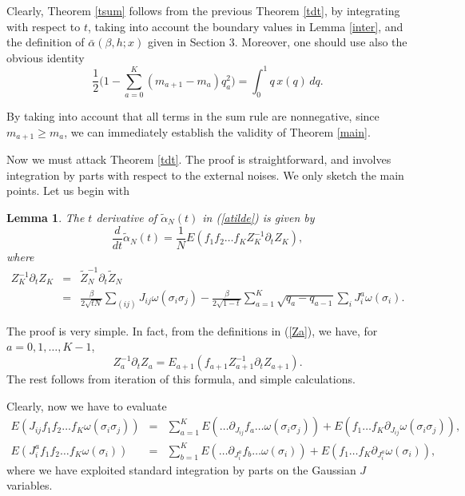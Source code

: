 \documentclass[a4paper,12pt]{article}
\newtheorem{lemma}{Lemma}
\begin{document}
Clearly, Theorem \ref{tsum} follows from the previous Theorem \ref{tdt}, by 
integrating with respect to $t$, taking into account the boundary values 
in Lemma 
\ref{inter}, and the definition of $\bar\alpha(\beta,h;x)$ given in Section 3.
Moreover, one should use also  the obvious identity
\begin{equation}
\frac{1}{2} \bigl(1-\sum_{a=0}^{K}(m_{a+1}-m_a)q^{2}_{a}\bigr)=
\int_{0}^{1} q \, x(q) \, dq.
\end{equation}

By taking into account that all terms in the sum rule are nonnegative, 
since $m_{a+1}\ge m_{a}$, we 
can immediately establish the validity of Theorem \ref{main}.

Now we must attack Theorem \ref{tdt}. The proof is straightforward, and 
involves integration by parts with respect to the external noises.
We only sketch the main points. Let us begin with
\begin{lemma}
\label{ldt}
The $t$ derivative of $\tilde\alpha_N(t)$ in (\ref{atilde}) is given by
\begin{equation}
\nonumber
\frac{d}{dt}\tilde\alpha_N(t)=\frac{1}{N}E(f_1 f_2 \dots f_K 
Z_K^{-1}\partial_t Z_K),
\end{equation}
where
\begin{eqnarray}
\nonumber
Z_K^{-1}\partial_t Z_K &=& \tilde Z_N^{-1}\partial_t \tilde Z_N\\
\nonumber
&=&\frac{\beta}{2 \sqrt{t N}}\sum_{(ij)} J_{ij} \omega(\sigma_i \sigma_j) -
\frac{\beta}{2 \sqrt{1-t}}\sum_{a=1}^K \sqrt{q_a - q_{a-1}} \sum_i 
J_i^a\omega(\sigma_i).
\end{eqnarray}
\end{lemma}

The proof is very simple. In fact, from the definitions in (\ref{Za}), we 
have, for $a=0,1,\dots,K-1$,
\begin{equation}
\nonumber
Z_a^{-1}\partial_t Z_a=E_{a+1}(f_{a+1}Z_{a+1}^{-1}\partial_t Z_{a+1}).
\end{equation}
The rest follows from iteration of this formula, and simple calculations.

Clearly, now we have to evaluate
\begin{eqnarray}
\nonumber
E(J_{ij}f_1 f_2 \dots f_K \omega(\sigma_i \sigma_j))&=&\sum_{a=1}^K E(\dots 
\partial_{J_{ij}}f_a\dots\omega(\sigma_i \sigma_j))+
E(f_1 \dots f_K \partial_{J_{ij}}\omega(\sigma_i \sigma_j)),\\
\nonumber
E(J_i^a f_1 f_2 \dots f_K \omega(\sigma_i))&=&\sum_{b=1}^K E(\dots 
\partial_{J_i^a}f_b\dots\omega(\sigma_i ))+
E(f_1 \dots f_K \partial_{J_i^a}\omega(\sigma_i)),
\end{eqnarray}
where we have exploited standard integration by parts on the Gaussian $J$ 
variables.
\end{document}

